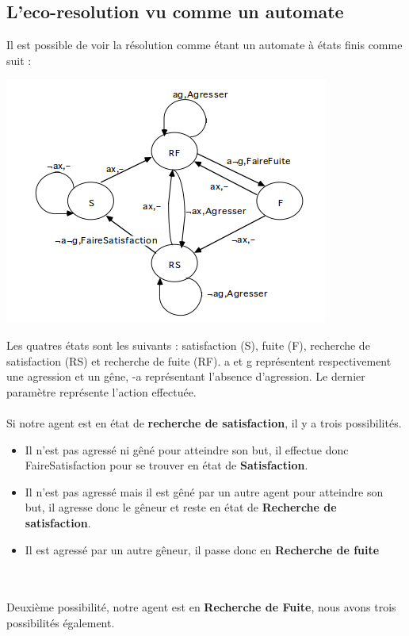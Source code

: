         \subsection{L'eco-resolution vu comme un automate}
        Il est possible de voir la résolution comme étant un automate à états finis comme suit : \\
\begin{center}
\includegraphics[scale=0.7]{images/AutomateEcoResolution.png}
\end{center}
Les quatres états sont les suivants : satisfaction (S), fuite (F), recherche de satisfaction (RS) et recherche de fuite (RF). a et g représentent respectivement une agression et un gêne, -a représentant l'absence d'agression. Le dernier paramètre représente l'action effectuée. \\
\\
Si notre agent est en état de \textbf{recherche de satisfaction}, il y a trois possibilités. \\
\begin{itemize}
\item Il n'est pas agressé ni gêné pour atteindre son but, il effectue donc FaireSatisfaction pour se trouver en état de \textbf{Satisfaction}.
\item Il n'est pas agressé mais il est gêné par un autre agent pour atteindre son but, il agresse donc le gêneur et reste en état de \textbf{Recherche de satisfaction}.
\item Il est agressé par un autre gêneur, il passe donc en \textbf{Recherche de fuite}
\end{itemize} ~\\
~\\
Deuxième possibilité, notre agent est en \textbf{Recherche de Fuite}, nous avons trois possibilités également. \\
